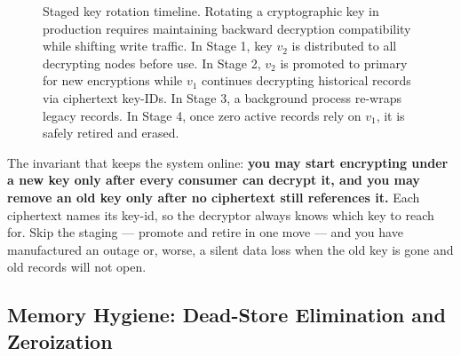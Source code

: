 \begin{figure}[H]
\caption{Staged key rotation timeline. Rotating a cryptographic key in production requires maintaining backward decryption compatibility while shifting write traffic. In Stage 1, key $v_2$ is distributed to all decrypting nodes before use. In Stage 2, $v_2$ is promoted to primary for new encryptions while $v_1$ continues decrypting historical records via ciphertext key-IDs. In Stage 3, a background process re-wraps legacy records. In Stage 4, once zero active records rely on $v_1$, it is safely retired and erased.}
\label{ch39:fig-rotation}
\end{figure}

The invariant that keeps the system online: \textbf{you may start encrypting under
a new key only after every consumer can decrypt it, and you may remove an old key
only after no ciphertext still references it.} Each ciphertext names its key-id, so
the decryptor always knows which key to reach for. Skip the staging --- promote and
retire in one move --- and you have manufactured an outage or, worse, a silent data
loss when the old key is gone and old records will not open.

\subsection{Memory Hygiene: Dead-Store Elimination and Zeroization}
\label{ch39:memory-hygiene}

